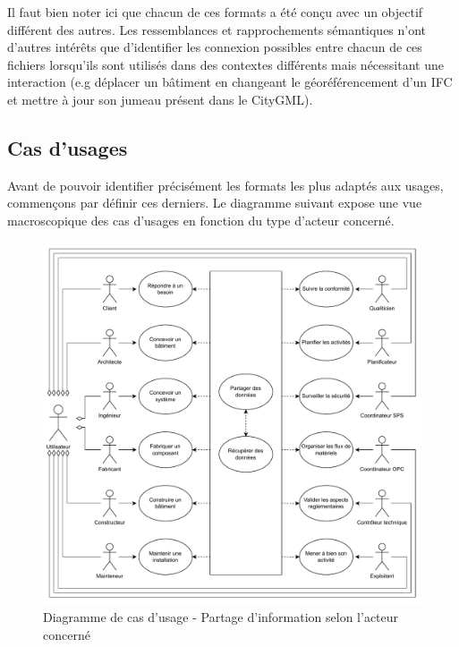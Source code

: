 Il faut bien noter ici que chacun de ces formats a été conçu avec un objectif différent des autres. Les ressemblances et rapprochements sémantiques n'ont d'autres intérêts que d'identifier les connexion possibles entre chacun de ces fichiers lorsqu'ils sont utilisés dans des contextes différents mais nécessitant une interaction (e.g déplacer un bâtiment en changeant le géoréférencement d'un IFC et mettre à jour son jumeau présent dans le CityGML).


\newpage

\subsection{Cas d'usages}
Avant de pouvoir identifier précisément les formats les plus adaptés aux usages, commençons par définir ces derniers. Le diagramme suivant expose une vue macroscopique des cas d'usages en fonction du type d'acteur concerné.

\begin{figure}[!h]
    \centering
    \includegraphics[width=1\linewidth]{imports/3DFiles_UseCase.pdf}
    \caption{Diagramme de cas d'usage - Partage d'information selon l'acteur concerné}
    \label{fig:enter-label}
\end{figure}

